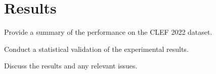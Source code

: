 \section{Results}
\label{sec:results}

Provide a summary of the performance on the CLEF 2022 dataset.

Conduct a statistical validation of the experimental results.

Discuss the results and any relevant issues.